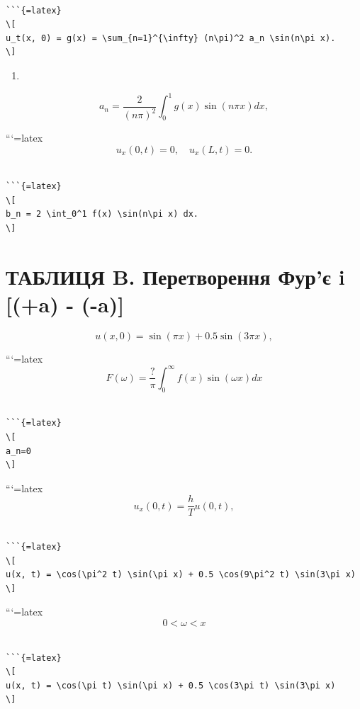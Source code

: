 \documentclass[
  ukrainian,
]{article}
\providecommand{\tightlist}{%
  \setlength{\itemsep}{0pt}\setlength{\parskip}{0pt}}
\begin{document}
\begin{verbatim}

```{=latex}
\[
u_t(x, 0) = g(x) = \sum_{n=1}^{\infty} (n\pi)^2 a_n \sin(n\pi x).
\]
\end{verbatim}

\begin{enumerate}
\def\labelenumi{\arabic{enumi}.}
\setcounter{enumi}{9}
\tightlist
\item
\end{enumerate}

\[
a_n = \frac{2}{(n\pi)^2} \int_0^1 g(x) \sin(n\pi x) dx,
\]

```{=latex}
\[
u_x(0, t) = 0, \quad u_x(L, t) = 0.
\]

\begin{verbatim}

```{=latex}
\[
b_n = 2 \int_0^1 f(x) \sin(n\pi x) dx.
\]
\end{verbatim}

\section{\texorpdfstring{ТАБЛИЦЯ B. Перетворення Фур'є i
 {[}\delta(\omega+a) -
\delta(\omega-a){]}}{ТАБЛИЦЯ B. Перетворення Фур'є i  {[}(+a) - (-a){]}}}\label{ux442ux430ux431ux43bux438ux446ux44f-b.-ux43fux435ux440ux435ux442ux432ux43eux440ux435ux43dux43dux44f-ux444ux443ux440ux454-i-a----a}

\[
u(x, 0) = \sin(\pi x) + 0.5 \sin(3\pi x),
\]

```{=latex}
\[
F(\omega) = \frac{?}{\pi} \int_{0}^{\infty} f(x) \sin(\omega x) dx
\]

\begin{verbatim}

```{=latex}
\[
a_n=0
\]
\end{verbatim}

```{=latex}
\[
u_{x}(0, t) = \frac{h}{T} u(0, t),
\]

\begin{verbatim}

```{=latex}
\[
u(x, t) = \cos(\pi^2 t) \sin(\pi x) + 0.5 \cos(9\pi^2 t) \sin(3\pi x)
\]
\end{verbatim}

```{=latex}
\[
0 < \omega < x
\]

\begin{verbatim}

```{=latex}
\[
u(x, t) = \cos(\pi t) \sin(\pi x) + 0.5 \cos(3\pi t) \sin(3\pi x)
\]
\end{verbatim}
\end{document}
